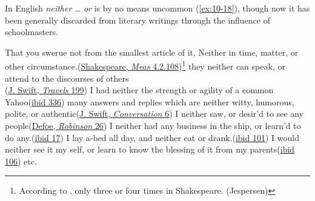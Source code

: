 In English \textit{neither {\dots} or} is by no means uncommon (\ref{ex:10-18}), though now it has been generally discarded from literary writings through the influence of schoolmasters.

\ea \label{ex:10-18}
\ea
That you swerue not from the smallest article of it, Neither in time, matter, or other circumstance.\hfill(\href{https://internetshakespeare.uvic.ca/doc/MM_F1/scene/4.2/index.html#tln-1965}{Shakespeare, \textit{Meas} 4.2.108})\footnote{According to \citet[\textit{\href{https://www.perseus.tufts.edu/hopper/text?doc=Perseus\%3Atext\%3A1999.03.0079\%3Aentry\%3DNeither}{Neither}}]{schmidt1886}, only three or four times in Shakespeare. (Jespersen)}
\ex
they neither can speak, or attend to the discourses of others\\\hfill(\href{https://archive.org/details/bim_eighteenth-century_the-works-of-j-s-dd-_swift-jonathan_1735_3/page/198/mode/2up?view=theater&q=%22attend+to+the+discourses%22}{J. Swift, \textit{Travels} 199}) 
\ex
I had neither the strength or agility of a common Yahoo\hfill(\href{https://archive.org/details/bim_eighteenth-century_the-works-of-j-s-dd-_swift-jonathan_1735_3/page/338/mode/2up?view=theater&q=%22agility+of+a+common%22}{ibid 336})
\ex
many answers and replies which are neither witty, humorous, polite, or authentic\hfill(\href{https://archive.org/details/cu31924013200898/page/n41/mode/2up?q=%22replies+which+are+neither%22&view=theater}{J. Swift, \textit{Conversation} 6}) %
\ex
I neither saw, or desir'd to see any people\hfill(\href{https://archive.org/details/lifeandstranges00dobsgoog/page/n51/mode/2up?q=%22I+neither%22&view=theater}{Defoe, \textit{Robinson} 26}) %
\ex
I neither had any business in the ship, or learn'd to do any.\hfill(\href{https://archive.org/details/lifeandstranges00dobsgoog/page/n43/mode/2up?q=%22I+neither%22&view=theater}{ibid 17}) %
\ex
I lay a-bed all day, and neither eat or drank.\hfill(\href{https://archive.org/details/lifeandstranges00dobsgoog/page/n127/mode/2up?q=%22neither+eat%22&view=theater}{ibid 101}) %
\ex
I would neither see it my self, or learn to know the blessing of it from my parents\hfill(\href{https://archive.org/details/lifeandstranges00dobsgoog/page/n131/mode/2up?q=%22but+I+would%22&view=theater}{ibid 106}) etc. %
